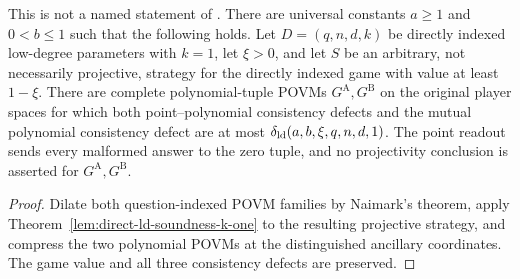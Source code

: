 \begin{theorem}
\label{thm:qld-direct-soundness-any-strategy}
\leanok
{}
This is not a named statement of \cite{Ji2020MIPStar}. There are universal
constants $a\geq1$ and $0<b\leq1$ such that the following holds. Let
$D=(q,n,d,k)$ be directly indexed low-degree parameters with $k=1$, let
$\xi>0$, and let $S$ be an arbitrary, not necessarily projective, strategy for
the directly indexed game with value at least $1-\xi$. There are complete
polynomial-tuple POVMs $G^{\mathrm A},G^{\mathrm B}$ on the original player
spaces for which both point--polynomial consistency defects and the mutual
polynomial consistency defect are at most
$\delta_{\rm ld}(a,b,\xi,q,n,d,1)$. The point readout sends every malformed
answer to the zero tuple, and no projectivity conclusion is asserted for
$G^{\mathrm A},G^{\mathrm B}$.
\end{theorem}
\begin{proof}
\leanok
{}
Dilate both question-indexed POVM families by Naimark's theorem, apply
Theorem~\ref{lem:direct-ld-soundness-k-one} to the resulting projective
strategy, and compress the two polynomial POVMs at the distinguished ancillary
coordinates. The game value and all three consistency defects are preserved.
\end{proof}

